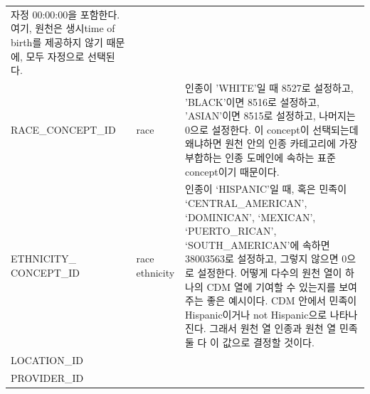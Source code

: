 \documentclass[10.5pt]{book}
\theoremstyle{definition}
\theoremstyle{definition}
\theoremstyle{definition}
\theoremstyle{remark}
\begin{document}
\begin{longtable}[]{@{}lll@{}}
\begin{minipage}[t]{0.50\columnwidth}
자정 00:00:00을 포함한다. 여기, 원천은 생시time of birth를 제공하지 않기
때문에, 모두 자정으로 선택된다.\strut
\end{minipage}\tabularnewline
\begin{minipage}[t]{0.28\columnwidth}\raggedright\strut
RACE\_CONCEPT\_ID\strut
\end{minipage} & \begin{minipage}[t]{0.13\columnwidth}\raggedright\strut
race\strut
\end{minipage} & \begin{minipage}[t]{0.50\columnwidth}\raggedright\strut
인종이 'WHITE'일 때 8527로 설정하고, 'BLACK'이면 8516로 설정하고,
'ASIAN'이면 8515로 설정하고, 나머지는 0으로 설정한다. 이 concept이
선택되는데 왜냐하면 원천 안의 인종 카테고리에 가장 부합하는 인종
도메인에 속하는 표준 concept이기 때문이다.\strut
\end{minipage}\tabularnewline
\begin{minipage}[t]{0.28\columnwidth}\raggedright\strut
ETHNICITY\_ CONCEPT\_ID\strut
\end{minipage} & \begin{minipage}[t]{0.13\columnwidth}\raggedright\strut
race ethnicity\strut
\end{minipage} & \begin{minipage}[t]{0.50\columnwidth}\raggedright\strut
인종이 `HISPANIC'일 때, 혹은 민족이 `CENTRAL\_AMERICAN', `DOMINICAN',
`MEXICAN', `PUERTO\_RICAN', `SOUTH\_AMERICAN'에 속하면 38003563로
설정하고, 그렇지 않으면 0으로 설정한다. 어떻게 다수의 원천 열이 하나의
CDM 열에 기여할 수 있는지를 보여주는 좋은 예시이다. CDM 안에서 민족이
Hispanic이거나 not Hispanic으로 나타나진다. 그래서 원천 열 인종과 원천
열 민족 둘 다 이 값으로 결정할 것이다.\strut
\end{minipage}\tabularnewline
\begin{minipage}[t]{0.28\columnwidth}\raggedright\strut
LOCATION\_ID\strut
\end{minipage} & \begin{minipage}[t]{0.13\columnwidth}\raggedright\strut
\strut
\end{minipage} & \begin{minipage}[t]{0.50\columnwidth}\raggedright\strut
\strut
\end{minipage}\tabularnewline
\begin{minipage}[t]{0.28\columnwidth}\raggedright\strut
PROVIDER\_ID\strut
\end{minipage} & \begin{minipage}[t]{0.13\columnwidth}\raggedright\strut

\end{minipage}
\end{longtable}
\end{document}
